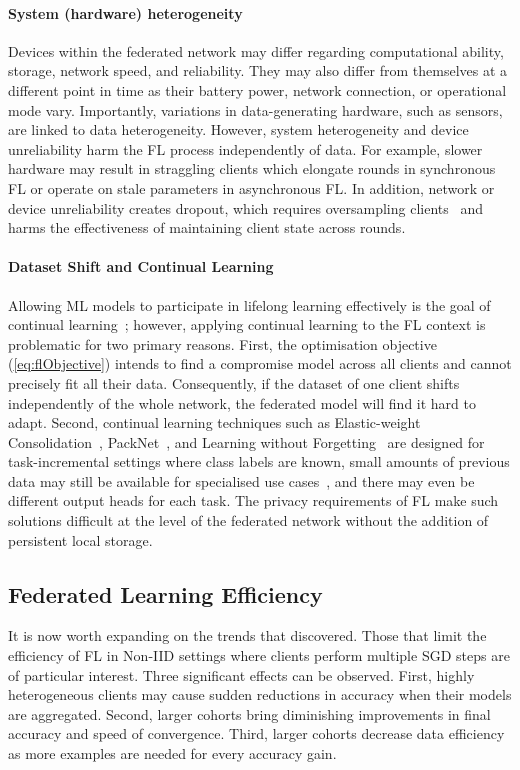 \paragraph{System (hardware) heterogeneity} Devices within the federated network may differ regarding computational ability, storage, network speed, and reliability. They may also differ from themselves at a different point in time as their battery power, network connection, or operational mode vary. Importantly, variations in data-generating hardware, such as sensors, are linked to data heterogeneity. However, system heterogeneity and device unreliability harm the FL process independently of data. For example, slower hardware may result in straggling clients which elongate rounds in synchronous FL or operate on stale parameters in asynchronous FL\@. In addition, network or device unreliability creates dropout, which requires oversampling clients~\cite{ScaleSystemDesign} and harms the effectiveness of maintaining client state across rounds.

\paragraph{Dataset Shift and Continual Learning}  Allowing ML models to participate in lifelong learning effectively is the goal of continual learning~\citep{ContinualLearningSurvey}; however, applying continual learning to the FL context is problematic for two primary reasons. First, the optimisation objective (\cref{eq:flObjective}) intends to find a compromise model across all clients and cannot precisely fit all their data. Consequently, if the dataset of one client shifts independently of the whole network, the federated model will find it hard to adapt. Second, continual learning techniques such as Elastic-weight Consolidation~\citep{kirkpatrick2017overcoming},  PackNet~\citep{PackNetAM}, and Learning without Forgetting~\citep{LearningWithoutForgetting} are designed for task-incremental settings where class labels are known, small amounts of previous data may still be available for specialised use cases~\citep{kirkpatrick2017overcoming}, and there may even be different output heads for each task. The privacy requirements of FL make such solutions difficult at the level of the federated network without the addition of persistent local storage.

\subsection{Federated Learning Efficiency}
It is now worth expanding on the trends that \citet{LargeCohorts} discovered. Those that limit the efficiency of FL in Non-IID settings where clients perform multiple SGD steps are of particular interest. Three significant effects can be observed. First, highly heterogeneous clients may cause sudden reductions in accuracy when their models are aggregated. Second, larger cohorts bring diminishing improvements in final accuracy and speed of convergence. Third, larger cohorts decrease data efficiency as more examples are needed for every accuracy gain.

